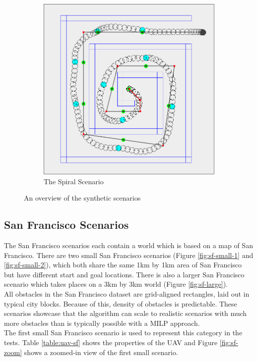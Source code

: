 \begin{figure}
\begin{subfigure}[t]{0.5\textwidth}
        		\includegraphics[width=\textwidth]{img/spiral}
        		\caption{The Spiral Scenario}
        		\label{fig:spiral}
	\end{subfigure}
        
    \caption{An overview of the synthetic scenarios}\label{fig:synth-scens}
\end{figure}
\clearpage
\subsection{San Francisco Scenarios}
\label{subsec:sf}
The San Francisco scenarios each contain a world which is based on a map of San Francisco. There are two small San Francisco scenarios (Figure \ref{fig:sf-small-1} and \ref{fig:sf-small-2}), which both share the same 1km by 1km area of San Francisco but have different start and goal locations. There is also a larger San Francisco scenario which takes places on a 3km by 3km world (Figure \ref{fig:sf-large}). \\
All obstacles in the San Francisco dataset are grid-aligned rectangles, laid out in typical city blocks. Because of this, density of obstacles is predictable. These scenarios showcase that the algorithm can scale to realistic scenarios with much more obstacles than is typically possible with a MILP approach. \\
The first small San Francisco scenario is used to represent this category in the tests. Table \ref{table:uav-sf} shows the properties of the UAV and Figure \ref{fig:sf-zoom} shows a zoomed-in view of the first small scenario. 


